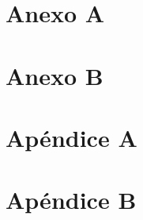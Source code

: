 \documentclass[12pt]{article}
\begin{document}
\newpage
\vspace*{0.1cm}

\section*{Anexo A}

\section*{Anexo B}

\section*{Apéndice A}

\section*{Apéndice B}
\end{document}

